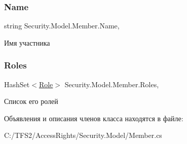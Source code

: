 \subsubsection{\texorpdfstring{Name}{Name}}
{\footnotesize\ttfamily string Security.\+Model.\+Member.\+Name\hspace{0.3cm}{\ttfamily [get]}, {\ttfamily [set]}}



Имя участника 

\mbox{\label{class_security_1_1_model_1_1_member_a5817410b5a16776962d4370ebad391f5}} 
\subsubsection{\texorpdfstring{Roles}{Roles}}
{\footnotesize\ttfamily Hash\+Set$<$\hyperlink{class_security_1_1_model_1_1_role}{Role}$>$ Security.\+Model.\+Member.\+Roles\hspace{0.3cm}{\ttfamily [get]}, {\ttfamily [set]}}



Список его ролей 



Объявления и описания членов класса находятся в файле\+:\begin{DoxyCompactItemize}
\item 
C\+:/\+T\+F\+S2/\+Access\+Rights/\+Security.\+Model/Member.\+cs\end{DoxyCompactItemize}
